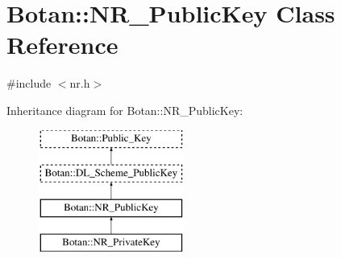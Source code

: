 \hypertarget{classBotan_1_1NR__PublicKey}{\section{Botan\-:\-:N\-R\-\_\-\-Public\-Key Class Reference}
\label{classBotan_1_1NR__PublicKey}
}


{\ttfamily \#include $<$nr.\-h$>$}

Inheritance diagram for Botan\-:\-:N\-R\-\_\-\-Public\-Key\-:\begin{figure}[H]
\begin{center}
\leavevmode
\includegraphics[height=4.000000cm]{classBotan_1_1NR__PublicKey}
\end{center}
\end{figure}
